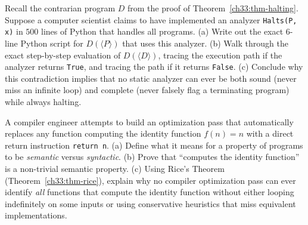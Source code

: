 \begin{exercise}
Recall the contrarian program $D$ from the proof of Theorem~\ref{ch33:thm-halting}.
Suppose a computer scientist claims to have implemented an analyzer \lstinline|Halts(P, x)| in $500$ lines of Python that handles all programs.
(a) Write out the exact $6$-line Python script for $D(\langle P \rangle)$ that uses this analyzer.
(b) Walk through the exact step-by-step evaluation of $D(\langle D \rangle)$, tracing the execution path if the analyzer returns \lstinline|True|, and tracing the path if it returns \lstinline|False|.
(c) Conclude why this contradiction implies that no static analyzer can ever be both sound (never miss an infinite loop) and complete (never falsely flag a terminating program) while always halting.
\end{exercise}

\begin{exercise}
A compiler engineer attempts to build an optimization pass that automatically replaces any function computing the identity function $f(n) = n$ with a direct return instruction \lstinline|return n|.
(a) Define what it means for a property of programs to be \emph{semantic} versus \emph{syntactic}.
(b) Prove that ``computes the identity function'' is a non-trivial semantic property.
(c) Using Rice's Theorem (Theorem~\ref{ch33:thm-rice}), explain why no compiler optimization pass can ever identify \emph{all} functions that compute the identity function without either looping indefinitely on some inputs or using conservative heuristics that miss equivalent implementations.
\end{exercise}
